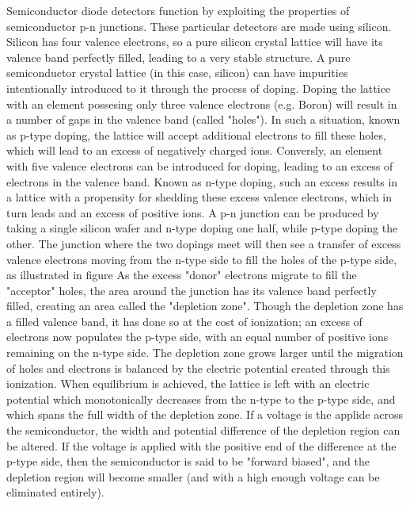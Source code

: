         Semiconductor diode detectors function by exploiting the properties of semiconductor p-n junctions.
        These particular detectors are made using silicon.
        Silicon has four valence electrons, so a pure silicon crystal lattice will have its valence band perfectly filled, leading to a very stable structure.
        A pure semiconductor crystal lattice (in this case, silicon) can have impurities intentionally introduced to it through the process of doping.
        Doping the lattice with an element possesing only three valence electrons (e.g. Boron) will result in a number of gaps in the valence band (called "holes").
        In such a situation, known as p-type doping, the lattice will accept additional electrons to fill these holes, which will lead to an excess of negatively charged ions.
        Conversly, an element with five valence electrons can be introduced for doping, leading to an excess of electrons in the valence band.
        Known as n-type doping, such an excess results in a lattice with a propensity for shedding these excess valence electrons, which in turn leads and an excess of positive ions.
        A p-n junction can be produced by taking a single silicon wafer and n-type doping one half, while p-type doping the other.
        The junction where the two dopings meet will then see a transfer of excess valence electrons moving from the n-type side to fill the holes of the p-type side, as illustrated in figure %
        As the excess "donor" electrons migrate to fill the "acceptor" holes, the area around the junction has its valence band perfectly filled, creating an area called the "depletion zone".
        Though the depletion zone has a filled valence band, it has done so at the cost of ionization; an excess of electrons now populates the p-type side, with an equal number of positive ions remaining on the n-type side.
        The depletion zone grows larger until the migration of holes and electrons is balanced by the electric potential created through this ionization.
        When equilibrium is achieved, the lattice is left with an electric potential which monotonically decreases from the n-type to the p-type side, and which spans the full width of the depletion zone. %
        If a voltage is the applide across the semiconductor, the width and potential difference of the depletion region can be altered.
        If the voltage is applied with the positive end of the difference at the p-type side, then the semiconductor is said to be "forward biased", and the depletion region will become smaller (and with a high enough voltage can be eliminated entirely). \cite{wiley_radiation_detection}

